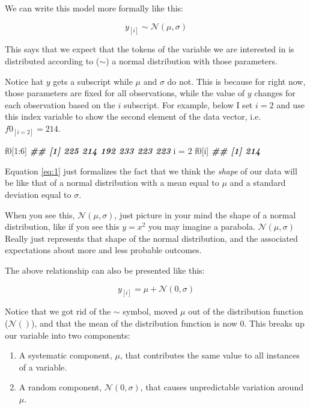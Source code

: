 \documentclass[
]{book}
\newenvironment{Shaded}{\begin{snugshade}}{\end{snugshade}}
\newcommand{\DecValTok}[1]{\textcolor[rgb]{0.00,0.00,0.81}{#1}}
\newcommand{\DocumentationTok}[1]{\textcolor[rgb]{0.56,0.35,0.01}{\textbf{\textit{#1}}}}
\newcommand{\NormalTok}[1]{#1}
\newcommand{\OtherTok}[1]{\textcolor[rgb]{0.56,0.35,0.01}{#1}}
\newcommand{\SpecialCharTok}[1]{\textcolor[rgb]{0.00,0.00,0.00}{#1}}
\begin{document}
We can write this model more formally like this:

\[
y_{[i]} \sim \mathcal{N}(\mu,\sigma)
\label{eq:1}
\]

This says that we expect that the tokens of the variable we are interested in is distributed according to (\(\sim\)) a normal distribution with those parameters.

Notice hat \(y\) gets a subscript while \(\mu\) and \(\sigma\) do not. This is because for right now, those parameters are fixed for all observations, while the value of \(y\) changes for each observation based on the \(i\) subscript. For example, below I set \(i=2\) and use this index variable to show the second element of the data vector, i.e.~\(f0_{[i=2]}=214\).

\begin{Shaded}
\begin{Highlighting}[]
\NormalTok{f0[}\DecValTok{1}\SpecialCharTok{:}\DecValTok{6}\NormalTok{]}
\DocumentationTok{\#\# [1] 225 214 192 233 223 223}
\NormalTok{i }\OtherTok{=} \DecValTok{2}
\NormalTok{f0[i]}
\DocumentationTok{\#\# [1] 214}
\end{Highlighting}
\end{Shaded}

Equation \eqref{eq:1} just formalizes the fact that we think the \emph{shape} of our data will be like that of a normal distribution with a mean equal to \(\mu\) and a standard deviation equal to \(\sigma\).

When you see this, \(\mathcal{N}(\mu,\sigma)\), just picture in your mind the shape of a normal distribution, like if you see this \(y=x^2\) you may imagine a parabola. \(\mathcal{N}(\mu,\sigma)\) Really just represents that shape of the normal distribution, and the associated expectations about more and less probable outcomes.

The above relationship can also be presented like this:

\[
y_{[i]} = \mu + \mathcal{N}(0,\sigma)
\label{eq:2}
\]

Notice that we got rid of the \(\sim\) symbol, moved \(\mu\) out of the distribution function (\(\mathcal{N}()\)), and that the mean of the distribution function is now 0. This breaks up our variable into two components:

\begin{enumerate}
\def\labelenumi{\arabic{enumi})}
\item
  A systematic component, \(\mu\), that contributes the same value to all instances of a variable.
\item
  A random component, \(\mathcal{N}(0,\sigma)\), that causes unpredictable variation around \(\mu\).
\end{enumerate}
\end{document}
